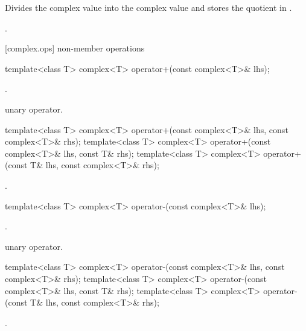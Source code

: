 \begin{itemdescr}
\pnum
\effects
Divides the complex value  into the complex value
and stores the quotient in
.

\pnum
\returns
{}.
\end{itemdescr}

[complex.ops]{ non-member operations}

%
\begin{itemdecl}
template<class T> complex<T> operator+(const complex<T>& lhs);
\end{itemdecl}

\begin{itemdescr}
\pnum
\returns
{}.

\pnum
\remarks
unary operator.
\end{itemdescr}

\begin{itemdecl}
template<class T> complex<T> operator+(const complex<T>& lhs, const complex<T>& rhs);
template<class T> complex<T> operator+(const complex<T>& lhs, const T& rhs);
template<class T> complex<T> operator+(const T& lhs, const complex<T>& rhs);
\end{itemdecl}

\begin{itemdescr}
\pnum
\returns
{}.
\end{itemdescr}

%
\begin{itemdecl}
template<class T> complex<T> operator-(const complex<T>& lhs);
\end{itemdecl}

\begin{itemdescr}
\pnum
\returns
{}.

\pnum
\remarks
unary operator.
\end{itemdescr}

%
\begin{itemdecl}
template<class T> complex<T> operator-(const complex<T>& lhs, const complex<T>& rhs);
template<class T> complex<T> operator-(const complex<T>& lhs, const T& rhs);
template<class T> complex<T> operator-(const T& lhs, const complex<T>& rhs);
\end{itemdecl}

\begin{itemdescr}
\pnum
\returns
{}.
\end{itemdescr}


